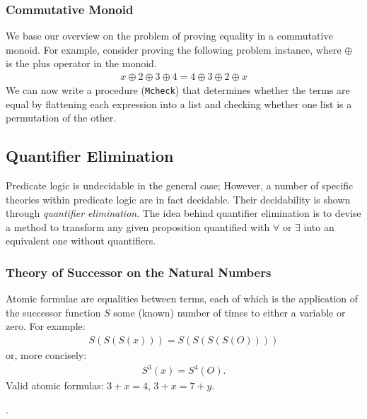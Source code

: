 \documentclass{beamer}
\begin{document}
\begin{frame}\justifying
  \frametitle{Commutative Monoid}
  We base our overview on the problem of proving equality in a commutative monoid\footnotemark. For example, consider proving the following problem instance, where $\oplus$ is the plus operator in the monoid.
  \begin{align*}
    x \oplus 2 \oplus 3 \oplus 4 = 4 \oplus 3 \oplus 2 \oplus x
  \end{align*}
  We can now write a procedure (\texttt{Mcheck}) that determines whether the terms are equal by flattening each expression into a list and checking whether one list is a permutation of the other.

\end{frame}

\begin{frame}\justifying
  \section{Quantifier Elimination}
  Predicate logic is undecidable in the general case; However, a number of specific theories within predicate logic are in fact decidable\footnotemark. Their decidability is shown through \textit{quantifier elimination}. The idea behind quantifier elimination is to devise a method to transform any given proposition quantified with $\forall$ or $\exists$ into an equivalent one without quantifiers.

\end{frame}

\begin{frame}\justifying
  \frametitle{Theory of Successor on the Natural Numbers}
  Atomic formulae are equalities between terms, each of which is the application of the successor function $S$ some (known) number of times to either a variable or zero\footnotemark. For example:
  \begin{align*}
    S(S(S(x))) = S(S(S(S(O))))
  \end{align*}
  or, more concisely:
  \begin{align*}
    S^3(x) = S^4(O).
  \end{align*}
  Valid atomic formulas: $3 + x = 4$, $3 + x = 7 + y$.

  .
\end{frame}
\end{document}
